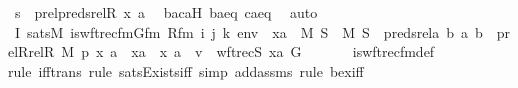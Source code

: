 \begin{isabellebody}
\ {\isachardoublequoteopen}s\ {\isasymin}\ prel{\isacharparenleft}{\kern0pt}preds{\isacharunderscore}{\kern0pt}rel{\isacharparenleft}{\kern0pt}R{\isacharcomma}{\kern0pt}\ x{\isacharparenright}{\kern0pt}{\isacharcomma}{\kern0pt}\ {\isacharbraceleft}{\kern0pt}a{\isacharbraceright}{\kern0pt}{\isacharparenright}{\kern0pt}{\isachardoublequoteclose}\ \isamarkupfalse%
\ bacaH\ baeq\ caeq\ \isamarkupfalse%
\ auto\ \isanewline
\ \ \isamarkupfalse%
\isanewline
\isanewline
\ \ \isamarkupfalse%
\ I{}{\isacharcolon}{\kern0pt}\ {\isachardoublequoteopen}sats{\isacharparenleft}{\kern0pt}M{\isacharcomma}{\kern0pt}\ is{\isacharunderscore}{\kern0pt}wftrec{\isacharunderscore}{\kern0pt}fm{\isacharparenleft}{\kern0pt}Gfm{\isacharcomma}{\kern0pt}\ Rfm{\isacharcomma}{\kern0pt}\ i{\isacharcomma}{\kern0pt}\ j{\isacharcomma}{\kern0pt}\ k{\isacharparenright}{\kern0pt}{\isacharcomma}{\kern0pt}\ env{\isacharparenright}{\kern0pt}\ {\isasymlongleftrightarrow}\ {\isacharparenleft}{\kern0pt}{\isasymexists}xa\ {\isasymin}\ M{\isachardot}{\kern0pt}\ {\isasymexists}S\ {\isasymin}\ M{\isachardot}{\kern0pt}\ S\ {\isacharequal}{\kern0pt}\ preds{\isacharunderscore}{\kern0pt}rel{\isacharparenleft}{\kern0pt}{\isasymlambda}a\ b{\isachardot}{\kern0pt}\ {\isasymlangle}a{\isacharcomma}{\kern0pt}\ b{\isasymrangle}\ {\isasymin}\ prel{\isacharparenleft}{\kern0pt}Rrel{\isacharparenleft}{\kern0pt}R{\isacharcomma}{\kern0pt}\ M{\isacharparenright}{\kern0pt}{\isacharcomma}{\kern0pt}\ p{\isacharparenright}{\kern0pt}{\isacharcomma}{\kern0pt}\ {\isasymlangle}x{\isacharcomma}{\kern0pt}\ a{\isasymrangle}{\isacharparenright}{\kern0pt}\ {\isasymand}\ xa\ {\isacharequal}{\kern0pt}\ {\isacharless}{\kern0pt}x{\isacharcomma}{\kern0pt}\ a{\isachargreater}{\kern0pt}\ {\isasymand}\ v\ {\isacharequal}{\kern0pt}\ wftrec{\isacharparenleft}{\kern0pt}S{\isacharcomma}{\kern0pt}\ xa{\isacharcomma}{\kern0pt}\ G{\isacharparenright}{\kern0pt}{\isacharparenright}{\kern0pt}{\isachardoublequoteclose}\ \isanewline
\ \ \ \ \isamarkupfalse%
\ is{\isacharunderscore}{\kern0pt}wftrec{\isacharunderscore}{\kern0pt}fm{\isacharunderscore}{\kern0pt}def\isanewline
\isanewline
\ \ \ \ \isamarkupfalse%
{\isacharparenleft}{\kern0pt}rule\ iff{\isacharunderscore}{\kern0pt}trans{\isacharcomma}{\kern0pt}\ rule\ sats{\isacharunderscore}{\kern0pt}Exists{\isacharunderscore}{\kern0pt}iff{\isacharcomma}{\kern0pt}\ simp\ add{\isacharcolon}{\kern0pt}assms{\isacharcomma}{\kern0pt}\ rule\ bex{\isacharunderscore}{\kern0pt}iff{\isacharparenright}{\kern0pt}\isanewline

\end{isabellebody}
